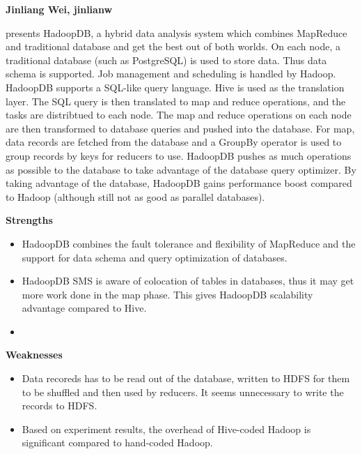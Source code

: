 \documentclass[12pt, a4paper]{llncs}
\begin{document}
\title{}
\author{Jinliang Wei, jinlianw}
\institute{}

\textbf{\centering Jinliang Wei, jinlianw}




\cite{Abouzeid:2009:HAH:1687627.1687731} presents HadoopDB, a hybrid data 
analysis system which combines MapReduce and traditional database and get the 
best out of both worlds. On each node, a traditional database (such as 
PostgreSQL) is used to store data. Thus data schema is supported. Job management
and scheduling is handled by Hadoop. HadoopDB supports a SQL-like query 
language. Hive is used as the translation layer. The SQL query is then 
translated to map and reduce operations, and the tasks are distribtued to each 
node. The map and reduce operations on each node are then 
transformed to database queries and pushed into the database. For map, data 
records are fetched from the database and a GroupBy operator is used to group 
records by keys for reducers to use. HadoopDB pushes as much operations as 
possible to the database to take advantage of the database query optimizer. By 
taking advantage of the database, HadoopDB gains performance boost compared to 
Hadoop (although still not as good as parallel databases).

\vspace{10pt}

\noindent
\textbf{Strengths}
\begin{itemize}
\item HadoopDB combines the fault tolerance and flexibility of MapReduce and the
support for data schema and query optimization of databases.

\item HadoopDB SMS is aware of colocation of tables in databases, thus it may 
  get more work done in the map phase. This gives HadoopDB scalability advantage
  compared to Hive.

\item 
  
\end{itemize}

\vspace{10pt}

\noindent
\textbf{Weaknesses}

\begin{itemize}

\item Data recoreds has to be read out of the database, written to HDFS for them
  to be shuffled and then used by reducers. It seems unnecessary to write the 
  records to HDFS.

\item Based on experiment results, the overhead of Hive-coded Hadoop is 
  significant compared to hand-coded Hadoop.

\end{itemize}
\end{document}
